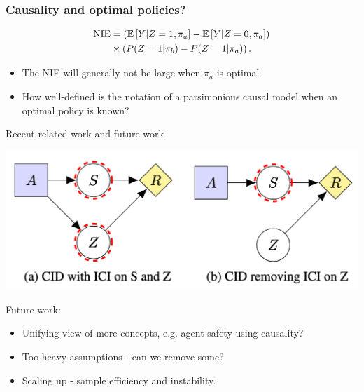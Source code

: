 
\begin{frame}\frametitle{Causality and optimal policies?}
    \begin{align*}
    	\mathrm{NIE} & = \left( \E\left[Y | Z=1, \pi_a \right] - \E\left[Y | Z=0, \pi_a \right] \right)  \\  
    	& \times  \left( P(Z=1| \pi_b) - P(Z=1| \pi_a) \right).%
    \end{align*}
    \begin{itemize}
    \item The NIE will generally not be large when $\pi_a$ is optimal
    \item How well-defined is the notation of a parsimonious causal model when an optimal policy is known? 
    \end{itemize}
\end{frame}

\begin{frame}{Recent related work and future work}
    \begin{center}
        \includegraphics[width=.5\textwidth]{images/cid.png}
    \end{center}
    
    Future work:
    \begin{itemize}
    \item Unifying view of more concepts, e.g. agent safety using causality?
    \item Too heavy assumptions - can we remove some?
    \item Scaling up - sample efficiency and instability.
    \end{itemize}

\end{frame}

